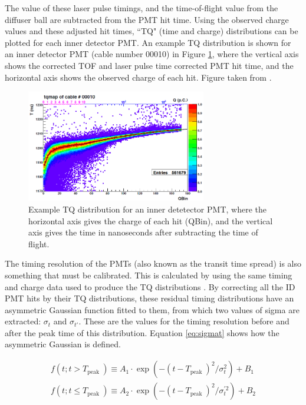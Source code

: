 The value of these laser pulse timings, and the time-of-flight value from the diffuser ball are subtracted from the PMT hit time. Using the observed charge values and these adjusted hit times, ``TQ" (time and charge) distributions can be plotted for each inner detector PMT. An example TQ distribution is shown for an inner detector PMT (cable number 00010) in Figure \ref{fig:TQdist}, where the vertical axis shows the corrected TOF and laser pulse time corrected PMT hit time, and the horizontal axis shows the observed charge of each hit. Figure taken from \cite{abe_calibration_2014}. 

\begin{figure}
    \centering 
    \includegraphics[width=0.7\textwidth]{Figures/TQdist.png}
\caption{Example TQ distribution for an inner detetector PMT, where the horizontal axis gives the charge of each hit (QBin), and the vertical axis gives the time in nanoseconds after subtracting the time of flight.}
    \label{fig:TQdist}
\end{figure}


The timing resolution of the PMTs (also known as the transit time spread) is also something that must be calibrated. This is calculated by using the same timing and charge data used to produce the TQ distributions \cite{dziomba2012study}. By correcting all the ID PMT hits by their TQ distributions, these residual timing distributions have an asymmetric Gaussian function fitted to them, from which two values of sigma are extracted: $\sigma_{t}$ and $\sigma_{t'}$. These are the values for the timing resolution before and after the peak time of this distribution. Equation \ref{eq:sigmat} shows how the asymmetric Gaussian is defined. 

\begin{align}
    f\left(t ; t>T_{\text {peak }}\right) \equiv A_{1} \cdot \exp \left(-\left(t-T_{\text {peak }}\right)^{2} / \sigma_{t}^{2}\right)+B_{1}\\
    f\left(t ; t \leq T_{\text {peak }}\right) \equiv A_{2} \cdot \exp \left(-\left(t-T_{\text {peak }}\right)^{2} / \sigma_{t}^{\prime 2}\right)+B_{2}
\label{eq:sigmat}
\end{align}

